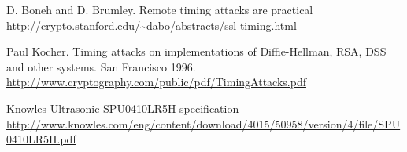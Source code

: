 \begin{thebibliography}{11}

 D. Boneh and D. Brumley. Remote timing attacks are practical
\url{http://crypto.stanford.edu/~dabo/abstracts/ssl-timing.html}

 Paul Kocher. Timing attacks on implementations of Diffie-Hellman, RSA, DSS and other systems. San Francisco 1996.
\url{http://www.cryptography.com/public/pdf/TimingAttacks.pdf}


 Knowles Ultrasonic SPU0410LR5H specification
\url{http://www.knowles.com/eng/content/download/4015/50958/version/4/file/SPU0410LR5H.pdf}

\end{thebibliography}